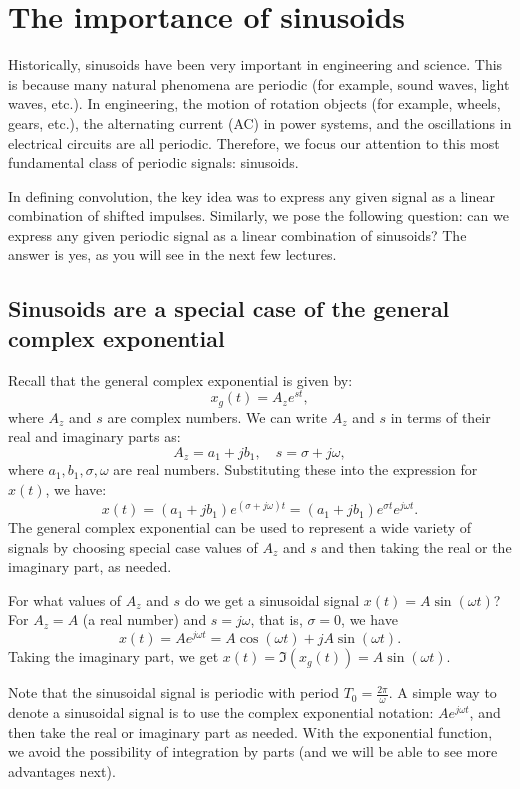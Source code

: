\documentclass{ee102_notes}
\begin{document}
\section{The importance of sinusoids}
Historically, sinusoids have been very important in engineering and science. This is because many natural phenomena are periodic (for example, sound waves, light waves, etc.).  In engineering, the motion of rotation objects (for example, wheels, gears, etc.), the alternating current (AC) in power systems, and the oscillations in electrical circuits are all periodic. Therefore, we focus our attention to this most fundamental class of periodic signals: sinusoids.

In defining convolution, the key idea was to express any given signal as a linear combination of shifted impulses. Similarly, we pose the following question: can we express any given periodic signal as a linear combination of sinusoids? The answer is yes, as you will see in the next few lectures.

\subsection{Sinusoids are a special case of the general complex exponential}
Recall that the general complex exponential is given by:
\[
x_g(t) = A_z e^{st},
\]
where \(A_z\) and \(s\) are complex numbers. We can write \(A_z\) and \(s\) in terms of their real and imaginary parts as:
\[
A_z = a_1 + j b_1, \quad s = \sigma + j\omega,
\] 
where \(a_1, b_1, \sigma, \omega\) are real numbers. Substituting these into the expression for \(x(t)\), we have:
\[
x(t) = (a_1 + j b_1) e^{(\sigma + j\omega)t} = (a_1 + j b_1) e^{\sigma t} e^{j\omega t}.
\]
The general complex exponential can be used to represent a wide variety of signals by choosing special case values of \(A_z\) and \(s\) and then taking the real or the imaginary part, as needed.

\begin{popquiz}
  For what values of \(A_z\) and \(s\) do we get a sinusoidal signal $x(t) = A\sin(\omega t)$? 
  \popqsplit
  For $A_z = A$ (a real number) and $s = j\omega$, that is, $\sigma = 0$, we have 
  \[
  x(t) = A e^{j\omega t} = A \cos(\omega t) + j A \sin(\omega t).
  \]
  Taking the imaginary part, we get $x(t) = \Im(x_g(t)) = A \sin(\omega t)$.
\end{popquiz}
Note that the sinusoidal signal is periodic with period \(T_0 = \frac{2\pi}{\omega}\). A simple way to denote a sinusoidal signal is to use the complex exponential notation: $A e^{j\omega t}$, and then take the real or imaginary part as needed. With the exponential function, we avoid the possibility of integration by parts (and we will be able to see more advantages next). 
\end{document}
